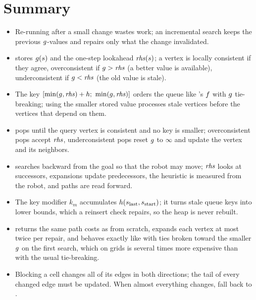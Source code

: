 \section{Summary}
\begin{summary}
\begin{itemize}
  \item Re-running \astar after a small change wastes work; an incremental search keeps
    the previous $g$-values and repairs only what the change invalidated.
  \item \lpastar stores $g(s)$ and the one-step lookahead $\mathit{rhs}(s)$; a vertex is
    locally consistent if they agree, overconsistent if $g > \mathit{rhs}$ (a better value
    is available), underconsistent if $g < \mathit{rhs}$ (the old value is stale).
  \item The key $[\min(\gcost,\rhs)+\hcost;\ \min(\gcost,\rhs)]$ orders the queue like
    \astar's $f$ with $g$ tie-breaking; using the smaller stored value
    processes stale vertices before the vertices that depend on them.
  \item \LpaComputeShortestPath pops until the query vertex is consistent and no key is
    smaller; overconsistent pops accept $\mathit{rhs}$, underconsistent pops reset $g$ to
    $\infty$ and update the vertex and its neighbors.
  \item \dstarlite searches backward from the goal so that the robot may move; $\mathit{rhs}$
    looks at successors, expansions update predecessors, the heuristic is measured from
    the robot, and paths are read forward.
  \item The key modifier $k_m$ accumulates $h(s_{\mathrm{last}}, s_{\mathrm{start}})$;
    it turns stale queue keys into lower bounds, which a reinsert check repairs, so the
    heap is never rebuilt.
  \item \dstarlite returns the same path costs as \astar from scratch, expands each
    vertex at most twice per repair, and behaves exactly like \astar with ties broken
    toward the smaller $g$ on the first search, which on grids is several times
    more expensive than \astar with the usual tie-breaking.
  \item Blocking a cell changes all of its edges in both directions; the tail of every
    changed edge must be updated. When almost everything changes, fall back to \astar.
\end{itemize}
\end{summary}

